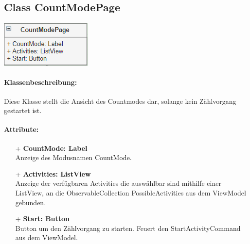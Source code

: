 \documentclass[a4paper,12pt]{article}
\begin{document}
\begin{minipage}[b]{0.7\textwidth}
	\subsection{Class CountModePage}
\end{minipage}
\begin{minipage}[c]{0.3\textwidth}
	\includegraphics[width=\textwidth]{bilder/ViewKlassen/CountModePage.png}
\end{minipage}
\paragraph{Klassenbeschreibung:}
Diese Klasse stellt die Ansicht des Countmodes dar, solange kein Zählvorgang gestartet ist.
\paragraph{Attribute:}
	\begin{itemize}
	\item[+] \textbf{CountMode: Label} \\ Anzeige des Modusnamen CountMode.
	\item[+] \textbf{Activities: ListView} \\ Anzeige der verfügbaren Activities die auswählbar sind mithilfe einer ListView, an die ObservableCollection PossibleActivities aus dem ViewModel gebunden.
	\item[+] \textbf{Start: Button} \\ Button um den Zählvorgang zu starten. Feuert den StartActivityCommand aus dem ViewModel.
	\end{itemize}
\end{document}
